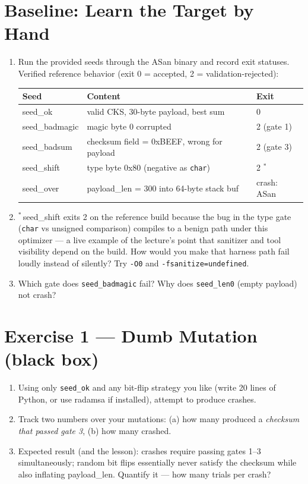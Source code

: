 \documentclass[12pt]{Training}
\begin{document}
\section*{Baseline: Learn the Target by Hand}
\begin{enumerate}
    \item Run the provided seeds through the ASan binary and record exit statuses. Verified reference behavior (exit 0 = accepted, 2 = validation-rejected):
        \begin{center}
        \footnotesize
        \begin{tabular}{@{}lll@{}}
        \toprule
        Seed & Content & Exit \\
        \midrule
        seed\_ok & valid CKS, 30-byte payload, best sum & 0 \\
        seed\_badmagic & magic byte 0 corrupted & 2 (gate 1) \\
        seed\_badsum & checksum field = 0xBEEF, wrong for payload & 2 (gate 3) \\
        seed\_shift & type byte 0x80 (negative as \lstinline|char|) & 2 $^{*}$ \\
        seed\_over & payload\_len = 300 into 64-byte stack buf & crash: ASan \\
        \bottomrule
        \end{tabular}
        \end{center}
    \item $^{*}$\,seed\_shift exits 2 on the reference build because the bug in the type gate (\lstinline{char} vs unsigned comparison) compiles to a benign path under this optimizer --- a live example of the lecture's point that sanitizer and tool visibility depend on the build. How would you make that harness path fail loudly instead of silently? Try \lstinline{-O0} and \lstinline{-fsanitize=undefined}.
    \item Which gate does \lstinline{seed_badmagic} fail? Why does \lstinline{seed_len0} (empty payload) not crash?
\end{enumerate}

\section*{Exercise 1 --- Dumb Mutation (black box)}
\begin{enumerate}
    \item Using only \lstinline{seed_ok} and any bit-flip strategy you like (write 20 lines of Python, or use radamsa if installed), attempt to produce crashes.
    \item Track two numbers over your mutations: (a) how many produced a \emph{checksum that passed gate 3}, (b) how many crashed.
    \item Expected result (and the lesson): crashes require passing gates 1--3 simultaneously; random bit flips essentially never satisfy the checksum while also inflating payload\_len. Quantify it --- how many trials per crash?
\end{enumerate}
\end{document}
